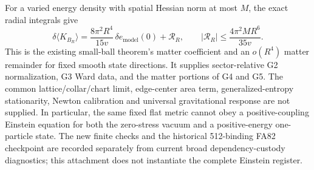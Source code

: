 For a varied energy density with spatial Hessian norm at most $M$,
the exact radial integrals give
\[
 \delta\langle K_{B_R}\rangle
 =\frac{8\pi^2R^4}{15v}\,\delta e_{\mathrm{model}}(0)
    +\mathcal R_R,
 \qquad |\mathcal R_R|\leq\frac{4\pi^2MR^6}{35v}.
\]
This is the existing small-ball theorem's matter coefficient and an
$o(R^4)$ matter remainder for fixed smooth state directions. It supplies
sector-relative G2 normalization, G3 Ward data, and the matter portions of
G4 and G5. The common lattice/collar/chart limit, edge-center area term,
generalized-entropy stationarity, Newton calibration and universal
gravitational response are not supplied. In particular, the same
fixed flat metric cannot obey a positive-coupling Einstein equation for
both the zero-stress vacuum and a positive-energy one-particle state.
The new finite checks and the historical 512-binding FA82 checkpoint are
recorded separately from current broad dependency-custody diagnostics;
this attachment does not instantiate the complete Einstein register.
